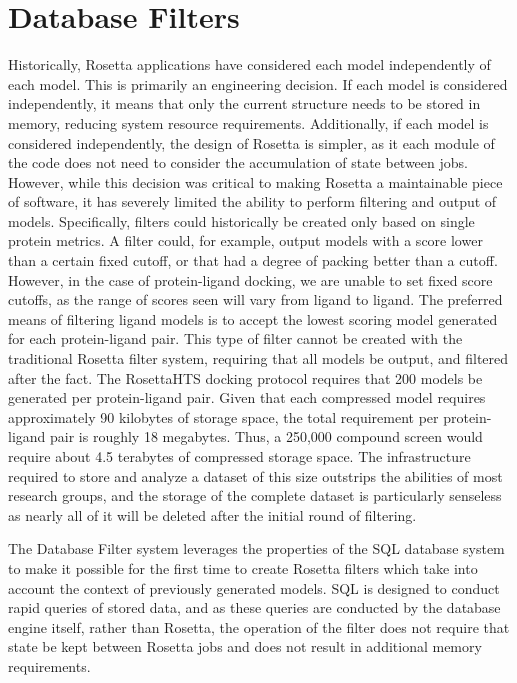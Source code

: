 \section{Database Filters}

Historically, Rosetta applications have considered each model independently of each model.
This is primarily an engineering decision.
If each model is considered independently, it means that only the current structure needs to be stored in memory, reducing system resource requirements. 
Additionally, if each model is considered independently, the design of Rosetta is simpler, as it each module of the code does not need to consider the accumulation of state between jobs.
However, while this decision was critical to making Rosetta a maintainable piece of software, it has severely limited the ability to perform filtering and output of models. 
Specifically, filters could historically be created only based on single protein metrics.
A filter could, for example, output models with a score lower than a certain fixed cutoff, or that had a degree of packing better than a cutoff.
However, in the case of protein-ligand docking, we are unable to set fixed score cutoffs, as the range of scores seen will vary from ligand to ligand.
The preferred means of filtering ligand models is to accept the lowest scoring model generated for each protein-ligand pair.
This type of filter cannot be created with the traditional Rosetta filter system, requiring that all models be output, and filtered after the fact.
The RosettaHTS docking protocol requires that 200 models be generated per protein-ligand pair. 
Given that each compressed model requires approximately 90 kilobytes of storage space, the total requirement per protein-ligand pair is roughly 18 megabytes.
Thus, a 250,000 compound screen would require about 4.5 terabytes of compressed storage space. 
The infrastructure required to store and analyze a dataset of this size outstrips the abilities of most research groups, and the storage of the complete dataset is particularly senseless as nearly all of it will be deleted after the initial round of filtering. 

The Database Filter system leverages the properties of the \ac{SQL} database system to make it possible for the first time to create Rosetta filters which take into account the context of previously generated models.
\ac{SQL} is designed to conduct rapid queries of stored data, and as these queries are conducted by the database engine itself, rather than Rosetta, the operation of the filter does not require that state be kept between Rosetta jobs and does not result in additional memory requirements.

